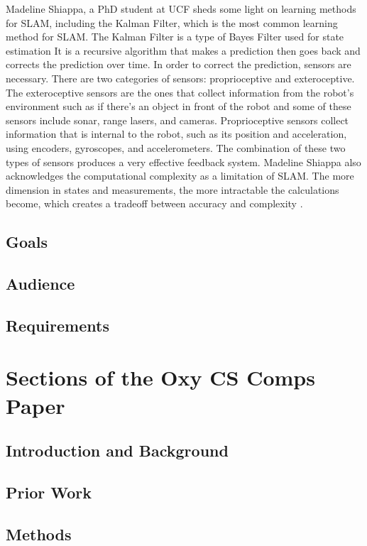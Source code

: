 \documentclass[10pt,twocolumn]{article}
\begin{document}
Madeline Shiappa, a PhD student at UCF sheds some light on learning methods for SLAM, including the Kalman Filter, which is the most common learning method for SLAM. The Kalman Filter is a type of Bayes Filter used for state estimation It is a recursive algorithm that makes a prediction then goes back and corrects the prediction over time. In order to correct the prediction, sensors are necessary. There are two categories of sensors: proprioceptive and exteroceptive. The exteroceptive sensors are the ones that collect information from the robot’s environment such as if there’s an object in front of the robot and some of these sensors include sonar, range lasers, and cameras. Proprioceptive sensors collect information that is internal to the robot, such as its position and acceleration, using encoders, gyroscopes, and accelerometers. The combination of these two types of sensors produces a very effective feedback system. Madeline Shiappa also acknowledges the computational complexity as a limitation of SLAM. The more dimension in states and measurements, the more intractable the calculations become, which creates a tradeoff between accuracy and complexity \textcite{Schiappa2019HowDoesAutonomous}.
\subsection{Goals}

\subsection{Audience}

\subsection{Requirements}

\section{Sections of the Oxy CS Comps Paper}

\subsection{Introduction and Background}


\subsection{Prior Work}

\subsection{Methods}
\end{document}
